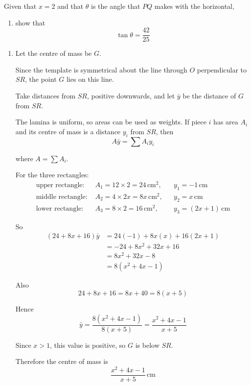 \documentclass[leqno]{article}
\begin{document}
\begin{enumerate}[
  label=\textbf{\arabic*.},
  leftmargin=*,
  topsep=0pt,
  partopsep=0pt,
  parsep=0pt
]
Given that $x=2$ and that $\theta$ is the angle that $PQ$ makes with the horizontal, \\
\begin{enumerate}[label=\textbf{(\alph*)}, resume]
  \item show that
  \[
  \tan\theta=\dfrac{42}{25}
  \]
\end{enumerate}

\vspace*{10pt}

\begin{djsSolution}
\begin{enumerate}[label=\textbf{(\alph*)}, start=1]
  \item Let the centre of mass be $G$.

Since the template is symmetrical about the line through $O$ perpendicular to $SR$, the point $G$ lies on this line.

Take distances from $SR$, positive downwards, and let $\bar y$ be the distance of $G$ from $SR$.

The lamina is uniform, so areas can be used as weights. If piece $i$ has area $A_i$ and its centre of mass is a distance $y_i$ from $SR$, then
\[
A\bar y=\sum A_iy_i
\]

where $A=\sum A_i$.

For the three rectangles:
\begin{align*}
\text{upper rectangle: }&A_1=12\times 2=24\,\mathrm{cm^2}, &&y_1=-1\,\mathrm{cm} \\
\text{middle rectangle: }&A_2=4\times 2x=8x\,\mathrm{cm^2}, &&y_2=x\,\mathrm{cm} \\
\text{lower rectangle: }&A_3=8\times 2=16\,\mathrm{cm^2}, &&y_3=(2x+1)\,\mathrm{cm}
\end{align*}

So
\begin{align*}
(24+8x+16)\bar y&=24(-1)+8x(x)+16(2x+1)\\
&=-24+8x^2+32x+16\\
&=8x^2+32x-8\\
&=8(x^2+4x-1)
\end{align*}

Also
\[
24+8x+16=8x+40=8(x+5)
\]

Hence
\[
\bar y=\frac{8(x^2+4x-1)}{8(x+5)}=\frac{x^2+4x-1}{x+5}
\]

Since $x>1$, this value is positive, so $G$ is below $SR$.

Therefore the centre of mass is
\[
\frac{x^2+4x-1}{x+5}\,\mathrm{cm}
\]


\end{enumerate}
\end{djsSolution}
\end{enumerate}
\end{document}
